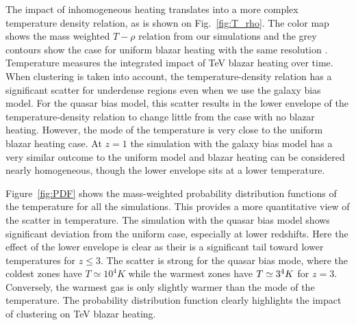 \documentclass[twocolumns]{emulateapj}
\begin{document}
The impact of inhomogeneous heating translates into a more complex temperature density relation, as is shown on Fig.~\ref{fig:T_rho}. The color map shows the mass weighted $T-\rho$ relation from our simulations and the grey contours show the case for uniform blazar heating  with the same resolution \citep{2012MNRAS.423..149P}.  Temperature measures the integrated impact of TeV blazar heating over time. When clustering is taken into account, the temperature-density relation has a significant scatter for underdense regions even when we use the galaxy bias model. For the quasar bias model, this scatter results in the lower envelope of the temperature-density relation to change little from the case with no blazar heating.  However, the mode of the temperature is very close to the uniform blazar heating case. At $z=1$ the simulation with the galaxy bias model has a very similar outcome to the uniform model and  blazar heating can be considered nearly homogeneous, though the lower envelope sits at a lower temperature.

Figure~\ref{fig:PDF} shows the mass-weighted probability distribution functions of the temperature for all the simulations. This provides a more quantitative view of the scatter in temperature.  The simulation with the quasar bias model shows significant deviation from the uniform case, especially at lower redshifts. Here the effect of the lower envelope is clear as their is a significant tail toward lower temperatures for $z \leqslant 3$. The scatter is strong for the quasar bias mode, where the coldest zones have $T\simeq 10^4K$ while the warmest zones have $T\simeq 3\time 10^4K$ for $z=3$. Conversely, the warmest gas is only slightly warmer than the mode of the temperature. The probability distribution function clearly highlights the impact of clustering on TeV blazar heating.
\end{document}

